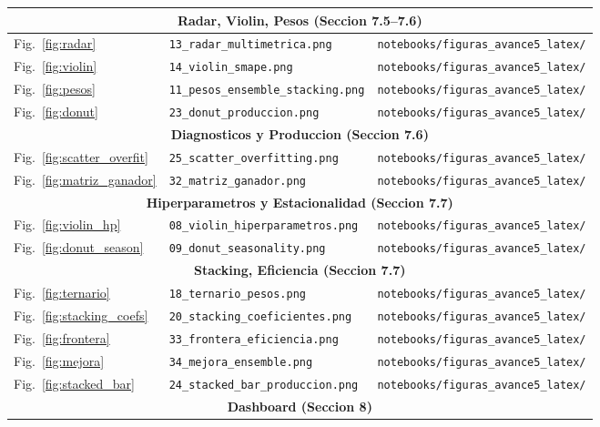 \documentclass[12pt, letterpaper]{article}
\begin{document}
{\begin{longtable}{p{3.5cm} p{5cm} p{6.5cm}}
\midrule
\multicolumn{3}{c}{\textbf{Radar, Violin, Pesos (Seccion 7.5--7.6)}} \\
\midrule
Fig.~\ref{fig:radar} & \texttt{13\_radar\_multimetrica.png} & \texttt{notebooks/figuras\_avance5\_latex/} \\
Fig.~\ref{fig:violin} & \texttt{14\_violin\_smape.png} & \texttt{notebooks/figuras\_avance5\_latex/} \\
Fig.~\ref{fig:pesos} & \texttt{11\_pesos\_ensemble\_stacking.png} & \texttt{notebooks/figuras\_avance5\_latex/} \\
Fig.~\ref{fig:donut} & \texttt{23\_donut\_produccion.png} & \texttt{notebooks/figuras\_avance5\_latex/} \\
\midrule
\multicolumn{3}{c}{\textbf{Diagnosticos y Produccion (Seccion 7.6)}} \\
\midrule
Fig.~\ref{fig:scatter_overfit} & \texttt{25\_scatter\_overfitting.png} & \texttt{notebooks/figuras\_avance5\_latex/} \\
Fig.~\ref{fig:matriz_ganador} & \texttt{32\_matriz\_ganador.png} & \texttt{notebooks/figuras\_avance5\_latex/} \\
\midrule
\multicolumn{3}{c}{\textbf{Hiperparametros y Estacionalidad (Seccion 7.7)}} \\
\midrule
Fig.~\ref{fig:violin_hp} & \texttt{08\_violin\_hiperparametros.png} & \texttt{notebooks/figuras\_avance5\_latex/} \\
Fig.~\ref{fig:donut_season} & \texttt{09\_donut\_seasonality.png} & \texttt{notebooks/figuras\_avance5\_latex/} \\
\midrule
\multicolumn{3}{c}{\textbf{Stacking, Eficiencia (Seccion 7.7)}} \\
\midrule
Fig.~\ref{fig:ternario} & \texttt{18\_ternario\_pesos.png} & \texttt{notebooks/figuras\_avance5\_latex/} \\
Fig.~\ref{fig:stacking_coefs} & \texttt{20\_stacking\_coeficientes.png} & \texttt{notebooks/figuras\_avance5\_latex/} \\
Fig.~\ref{fig:frontera} & \texttt{33\_frontera\_eficiencia.png} & \texttt{notebooks/figuras\_avance5\_latex/} \\
Fig.~\ref{fig:mejora} & \texttt{34\_mejora\_ensemble.png} & \texttt{notebooks/figuras\_avance5\_latex/} \\
Fig.~\ref{fig:stacked_bar} & \texttt{24\_stacked\_bar\_produccion.png} & \texttt{notebooks/figuras\_avance5\_latex/} \\
\midrule
\multicolumn{3}{c}{\textbf{Dashboard (Seccion 8)}} \\

\end{longtable}}
\end{document}
